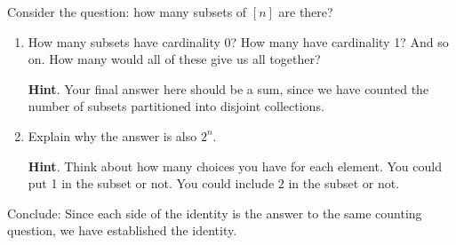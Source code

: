 \documentclass{book}
\begin{document}
\setcounter{cpjt}{78}
\addtocounter{cpjt}{-1}
\begin{activity}\label{activity-pascalrow-dc}
\hypertarget{p-579}{}%
Consider the question: how many subsets of \([n]\) are there?%
\begin{enumerate}[font=\bfseries,label=(\alph*),ref=\alph*]
\item\label{task-109} \hypertarget{p-580}{}%
How many subsets have cardinality 0?  How many have cardinality 1?  And so on.  How many would all of these give us all together?%
\par\smallskip%
\noindent\textbf{Hint}.\hypertarget{hint-34}{}\quad%
\hypertarget{p-581}{}%
Your final answer here should be a sum, since we have counted the number of subsets partitioned into disjoint collections.%
\item\label{task-110} \hypertarget{p-582}{}%
Explain why the answer is also \(2^n\).%
\par\smallskip%
\noindent\textbf{Hint}.\hypertarget{hint-35}{}\quad%
\hypertarget{p-583}{}%
Think about how many choices you have for each element.  You could put 1 in the subset or not.  You could include \(2\) in the subset or not.%
\end{enumerate}
\bigbreak
\hypertarget{p-584}{}%
Conclude: Since each side of the identity is the answer to the same counting question, we have established the identity.%
\end{activity}

\clearpage
\end{document}
